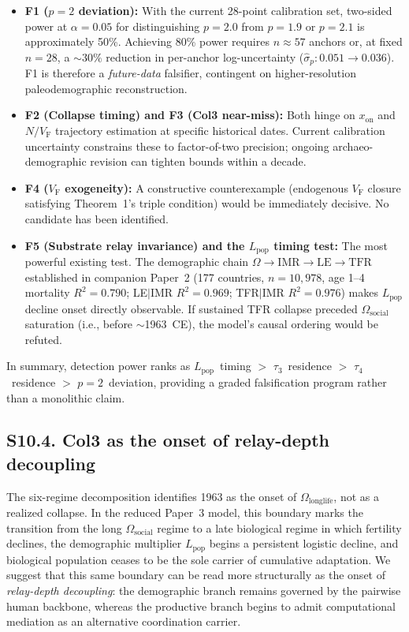 \documentclass[11pt]{article}
\newcommand{\VF}{V_{\mathrm{F}}}
\begin{document}
\begin{itemize}
\item \textbf{F1 ($p=2$ deviation):} With the current 28-point calibration set,
  two-sided power at $\alpha=0.05$ for distinguishing $p=2.0$ from $p=1.9$
  or $p=2.1$ is approximately 50\%.  Achieving 80\% power requires
  $n\approx 57$ anchors or, at fixed $n=28$, a ${\sim}30\%$ reduction
  in per-anchor log-uncertainty ($\hat\sigma_p: 0.051\to 0.036$).
  F1 is therefore a \emph{future-data} falsifier, contingent on
  higher-resolution paleodemographic reconstruction.

\item \textbf{F2 (Collapse timing) and F3 (Col3 near-miss):}
  Both hinge on $x_{\mathrm{on}}$ and $N/\VF$ trajectory estimation
  at specific historical dates.  Current calibration uncertainty
  constrains these to factor-of-two precision; ongoing archaeo-demographic
  revision can tighten bounds within a decade.

\item \textbf{F4 ($\VF$ exogeneity):} A constructive counterexample
  (endogenous $\VF$ closure satisfying Theorem~1's triple condition)
  would be immediately decisive.  No candidate has been identified.

\item \textbf{F5 (Substrate relay invariance) and the $L_{\mathrm{pop}}$
  timing test:} The most powerful existing test.  The demographic
  chain $\Omega\to\mathrm{IMR}\to\mathrm{LE}\to\mathrm{TFR}$ established
  in companion Paper~2 (177 countries, $n=10{,}978$, age 1--4 mortality
  $R^2=0.790$; LE$|$IMR $R^2=0.969$; TFR$|$IMR $R^2=0.976$) makes
  $L_{\mathrm{pop}}$ decline onset directly observable.  If sustained
  TFR collapse preceded $\Omega_{\mathrm{social}}$ saturation
  (i.e., before ${\sim}$1963~CE), the model's causal ordering would
  be refuted.
\end{itemize}

In summary, detection power ranks as
$L_{\mathrm{pop}}$~timing $>$ $\tau_3$~residence $>$ $\tau_4$~residence
$>$ $p=2$~deviation, providing a graded falsification program rather
than a monolithic claim.

\subsection*{S10.4. Col3 as the onset of relay-depth decoupling}

The six-regime decomposition identifies 1963 as the onset of
$\Omega_{\mathrm{longlife}}$, not as a realized collapse. In the reduced
Paper~3 model, this boundary marks the transition from the long
$\Omega_{\mathrm{social}}$ regime to a late biological regime in which
fertility declines, the demographic multiplier $L_{\mathrm{pop}}$ begins a
persistent logistic decline, and biological population ceases to be the sole
carrier of cumulative adaptation. We suggest that this same boundary can be
read more structurally as the onset of \emph{relay-depth decoupling}: the
demographic branch remains governed by the pairwise human backbone, whereas the
productive branch begins to admit computational mediation as an alternative
coordination carrier.
\end{document}
